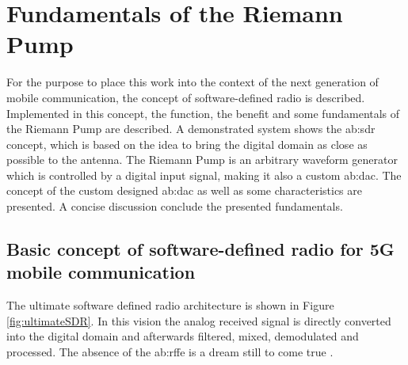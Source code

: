 \chapter{Fundamentals of the Riemann Pump}
\label{ch:fundamentals}
For the purpose to place this work into the context of the next generation of mobile communication, the concept of software-defined radio is described.
Implemented in this concept, the function, the benefit and some fundamentals of the Riemann Pump are described. 
A demonstrated system shows the \gls{ab:sdr} concept, which is based on the idea to bring the digital domain as close as possible to the antenna.
The Riemann Pump is an arbitrary waveform generator which is controlled by a digital input signal, making it also a custom \gls{ab:dac}.
The concept of the custom designed \gls{ab:dac} as well as some characteristics are presented.
A concise discussion conclude the presented fundamentals.

\section{Basic concept of software-defined radio for 5G mobile communication}
The ultimate software defined radio architecture is shown in Figure \ref{fig:ultimateSDR}.
In this vision the analog received signal is directly converted into the digital domain and afterwards filtered, mixed, demodulated and processed.
The absence of the \gls{ab:rffe} is a dream still to come true \cite{RivetDevalJ.-B.EtAl2010}.

